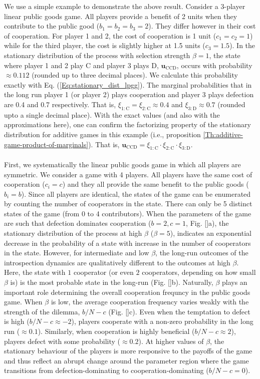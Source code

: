 \documentclass[11pt]{article}
\theoremstyle{plainCl1}
\theoremstyle{plainCl2}
\newcommand{\ubf}{\mathbf{u}}
\newcommand{\C}{\mathrm{C}}
\newcommand{\D}{\mathrm{D}}
\begin{document}
\noindent We use a simple example to demonstrate the above result. Consider a 3-player linear public goods game. All players provide a benefit of 2 units when they contribute to the public good ($b_1 = b_2 = b_3 = 2$). They differ however in their cost of cooperation. For player 1 and 2, the cost of cooperation is 1 unit ($c_1 = c_2 = 1$) while for the third player, the cost is slightly higher at 1.5 units ($c_3 = 1.5$). In the stationary distribution of the process with selection strength $\beta = 1$, the state where player 1 and 2 play $\C$ and player 3 plays $\D$, $\ubf_{\C\C\D}$, occurs with probability $\approx 0.112$ (rounded up to three decimal places). We calculate this probability exactly with Eq. (\ref{Eq:stationary_dist_lpgg}). The marginal probabilities that in the long run player 1 (or player 2) plays cooperation and player 3 plays defection are 0.4 and 0.7 respectively. That is, $\xi_{1:\C} = \xi_{2:\C} \approx 0.4$ and $\xi_{3:\D} \approx 0.7$ (rounded upto a single decimal place). With the exact values (and also with the approximations here), one can confirm the factorizing property of the stationary distribution for additive games in this example (i.e., proposition \ref{Th:additive-game-product-of-marginals}). That is, $\ubf_{\C\C\D} = \xi_{1:\C} \cdot \xi_{2:\C} \cdot \xi_{3:\D}$. \\ \\
\noindent First, we systematically the linear public goods game in which all players are symmetric. We consider a game with 4 players. All players have the same cost of cooperation ($c_i = c$) and they all provide the same benefit to the public goods ($b_i = b$). Since all players are identical, the states of the game can be enumerated by counting the number of cooperators in the state. There can only be 5 distinct states of the game (from 0 to 4 contributors). When the parameters of the game are such that defection dominates cooperation ($b = 2, c = 1$, Fig. \ref{}a), the stationary distribution of the process at high $\beta$ ($\beta = 5$), indicates an exponential decrease in the probability of a state with increase in the number of cooperators in the state. However, for intermediate and low $\beta$, the long-run outcomes of the introspection dynamics are qualitatively different to the outcomes at high $\beta$. Here, the state with $1$ cooperator (or even $2$ cooperators, depending on how small $\beta$ is) is the most probable state in the long-run (Fig. \ref{}b).  Naturally, $\beta$ plays an important role determining the overall cooperation frequncy in the public goods game. When $\beta$ is low, the average cooperation frequency varies weakly with the strength of the dilemma, $b/N - c$ (Fig. \ref{}c). Even when the temptation to defect is high ($b/N - c \approx -2$), players cooperate with a non-zero probability in the long run ($\approx 0.1$). Similarly, when cooperation is highly beneficial ($b/N - c \approx 2$), players defect with some probability ($\approx 0.2$). At higher values of $\beta$, the stationary behaviour of the players is more responsive to the payoffs of the game and thus reflect an abrupt change around the parameter region where the game transitions from defection-dominating to cooperation-dominating ($b/N - c = 0$).  \\ \\
\end{document}
